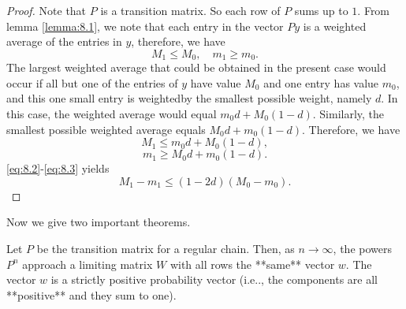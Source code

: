 \begin{proof}
Note that $P$ is a transition matrix. So each row of $P$ sums up to $1$. From lemma \ref{lemma:8.1}, we note that each entry in the vector $Py$ is a weighted average of the entries in $y$, therefore, we have
\begin{equation}
    \label{eq:8.1}
    \tag{8-1}
    M_1 \leq M_0, \quad m_1 \geq m_0.
\end{equation}
The largest weighted average that could be obtained in the present case would occur if all but one of the entries of $y$ have value $M_0$ and one entry has value $m_0$, and this one small entry is weightedby the smallest possible weight, namely $d$. In this case, the weighted average would equal $m_0 d + M_0(1-d)$.
Similarly, the smallest possible weighted average equals $M_0 d + m_0(1-d)$.
Therefore, we have 
\begin{equation}
    \label{eq:8.2}
    \tag{8-2}
    M_1 \leq m_0 d + M_0(1-d),
\end{equation}
\begin{equation}
    \label{eq:8.3}
    \tag{8-3}
    m_1 \geq M_0 d + m_0(1-d). 
\end{equation}
\eqref{eq:8.2}-\eqref{eq:8.3} yields 
\begin{equation*}
    M_1 - m_1 \leq (1-2d) (M_0 - m_0).
\end{equation*}
\end{proof}

Now we give two important theorems.

\begin{theorem}
\label{thm:8.1}
Let $P$ be the transition matrix for a regular chain. Then, as $n \to \infty$, the powers $P^n$ approach a limiting matrix $W$ with all rows the **same** vector $w$. The vector $w$ is a strictly positive probability vector (i.e.., the components are all **positive** and they sum to one).
\end{theorem}

